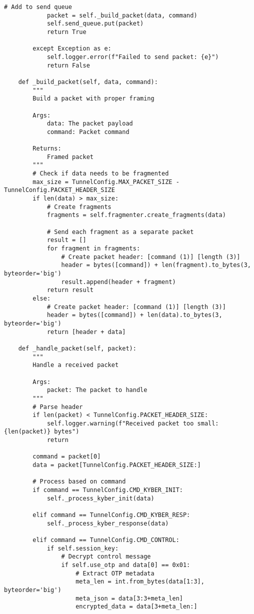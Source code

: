 \documentclass[12pt,a4paper]{report}
\begin{document}
\begin{lstlisting}[style=python, caption=Tunnel Implementation]
            # Add to send queue
            packet = self._build_packet(data, command)
            self.send_queue.put(packet)
            return True
            
        except Exception as e:
            self.logger.error(f"Failed to send packet: {e}")
            return False
            
    def _build_packet(self, data, command):
        """
        Build a packet with proper framing
        
        Args:
            data: The packet payload
            command: Packet command
            
        Returns:
            Framed packet
        """
        # Check if data needs to be fragmented
        max_size = TunnelConfig.MAX_PACKET_SIZE - TunnelConfig.PACKET_HEADER_SIZE
        if len(data) > max_size:
            # Create fragments
            fragments = self.fragmenter.create_fragments(data)
            
            # Send each fragment as a separate packet
            result = []
            for fragment in fragments:
                # Create packet header: [command (1)] [length (3)]
                header = bytes([command]) + len(fragment).to_bytes(3, byteorder='big')
                result.append(header + fragment)
            return result
        else:
            # Create packet header: [command (1)] [length (3)]
            header = bytes([command]) + len(data).to_bytes(3, byteorder='big')
            return [header + data]
            
    def _handle_packet(self, packet):
        """
        Handle a received packet
        
        Args:
            packet: The packet to handle
        """
        # Parse header
        if len(packet) < TunnelConfig.PACKET_HEADER_SIZE:
            self.logger.warning(f"Received packet too small: {len(packet)} bytes")
            return
            
        command = packet[0]
        data = packet[TunnelConfig.PACKET_HEADER_SIZE:]
        
        # Process based on command
        if command == TunnelConfig.CMD_KYBER_INIT:
            self._process_kyber_init(data)
            
        elif command == TunnelConfig.CMD_KYBER_RESP:
            self._process_kyber_response(data)
            
        elif command == TunnelConfig.CMD_CONTROL:
            if self.session_key:
                # Decrypt control message
                if self.use_otp and data[0] == 0x01:
                    # Extract OTP metadata
                    meta_len = int.from_bytes(data[1:3], byteorder='big')
                    meta_json = data[3:3+meta_len]
                    encrypted_data = data[3+meta_len:]
                    

\end{lstlisting}
\end{document}
